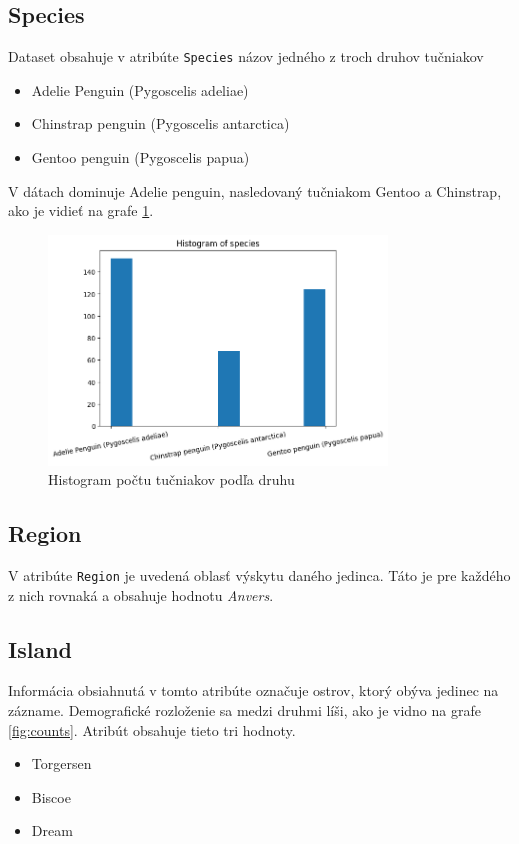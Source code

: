 \documentclass[10pt,xcolor=pdflatex,dvipsnames,table,oneside]{book}
\begin{document}
\subsection*{Species}
Dataset obsahuje v atribúte \texttt{Species} názov jedného z troch druhov tučniakov
\begin{itemize}
  \item Adelie Penguin (Pygoscelis adeliae)
  \item Chinstrap penguin (Pygoscelis antarctica)
  \item Gentoo penguin (Pygoscelis papua)
\end{itemize}


V dátach dominuje Adelie penguin, nasledovaný tučniakom Gentoo a Chinstrap, ako je vidieť na grafe \ref{fig:species_graph}.
\begin{figure}[h]
  \includegraphics[width=9cm]{img/species.png}
  \centering
  \caption{Histogram počtu tučniakov podľa druhu}
  \label{fig:species_graph}
\end{figure}


\subsection*{Region}
V atribúte \texttt{Region} je uvedená oblasť výskytu daného jedinca. Táto je pre každého z nich rovnaká a obsahuje hodnotu \textit{Anvers}.


\subsection*{Island}
Informácia obsiahnutá v tomto atribúte označuje ostrov, ktorý obýva jedinec na zázname. Demografické rozloženie sa medzi druhmi líši, ako je vidno na grafe \ref{fig:counts}.
Atribút obsahuje tieto tri hodnoty.
\begin{itemize}
  \item Torgersen
  \item Biscoe
  \item Dream
\end{itemize}
\end{document}

